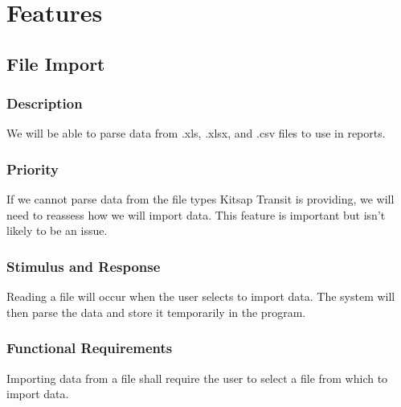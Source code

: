 \section{Features}


\subsection{File Import}
\subsubsection{Description}
We will be able to parse data from .xls, .xlsx, and .csv files to use in reports.

\subsubsection{Priority}
If we cannot parse data from the file types Kitsap Transit is providing, we will need to reassess how we will import data. This feature is important but isn't likely to be an issue.

\subsubsection{Stimulus and Response}
Reading a file will occur when the user selects to import data. The system will then parse the data and store it temporarily in the program.

\subsubsection{Functional Requirements}
Importing data from a file shall require the user to select a file from which to import data. 
